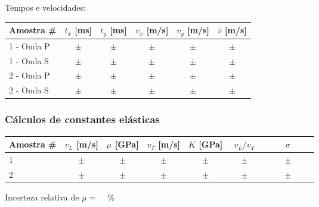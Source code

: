 \documentclass[a4paper,12pt]{article}  %
\begin{document}

Tempos e velocidades:
\begin{center}
	\begin{tabular}{|l|c|c|c|c|c|	}
	\hline
	  Amostra \# &   $t_x$ [ms]  &   $t_y$ [ms]  &   $v_x$ [m/s] & $v_y$ [m/s] &  
	  $\overline{v} $ [m/s]	\\
	\hline \hline
	  1 - Onda P   & $ \quad \pm \quad $  & $ \quad \pm \quad $ & $ \quad \pm \quad $ & $ \quad \pm \quad $ & $ \quad \pm \quad $ \\ \hline
	  1 - Onda S   & $ \quad \pm \quad $  & $ \quad \pm \quad $ & $ \quad \pm \quad $ & $ \quad \pm \quad $ & $ \quad \pm \quad $ \\ \hline
	  2 - Onda P   & $ \quad \pm \quad $  & $ \quad \pm \quad $ & $ \quad \pm \quad $ & $ \quad \pm \quad $ & $ \quad \pm \quad $ \\ \hline
	  2 - Onda S   & $ \quad \pm \quad $  & $ \quad \pm \quad $ & $ \quad \pm \quad $ & $ \quad \pm \quad $ & $ \quad \pm \quad $ \\ \hline
 	\end{tabular}
\end{center}


\subsubsection{\sf Cálculos de constantes elásticas}%

\begin{center}
	\begin{tabular}{|l|c|c|c|c|c|c|}
	\hline
	  Amostra \# &   $v_L$ [m/s]  &   $\mu$ [GPa]  &  $v_T$ [m/s] & $K$ [GPa] & $v_L/v_T$  &  $\sigma$  	\\
	\hline \hline
	  1   & $ \quad \pm \quad $ &  $ \quad \pm \quad $ & $ \quad \pm \quad $ & $ \quad \pm \quad $ & $ \quad \pm \quad $ & $ \qquad \pm \qquad $ \\ \hline
 	  2   & $ \quad \pm \quad $ &  $ \quad \pm \quad $ & $ \quad \pm \quad $ & $ \quad \pm \quad $ & $ \quad \pm \quad $ & $ \qquad \pm \qquad $ \\ \hline
 	\end{tabular}
\end{center}

Incerteza relativa de $\mu=$ ~\underline{\makebox[1cm][r]{~}} \%

\end{document}
